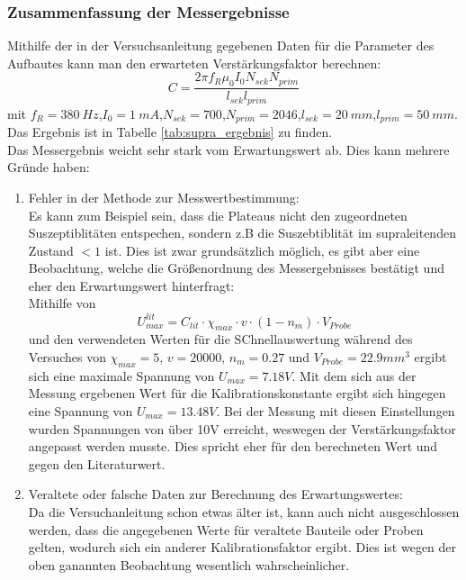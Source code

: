\documentclass[12pt,a4paper]{article}
\begin{document}
\newpage
\subsubsection{Zusammenfassung der Messergebnisse}
Mithilfe der in der Versuchsanleitung gegebenen Daten für die Parameter des Aufbautes kann man den erwarteten Verstärkungsfaktor berechnen:
\begin{equation}
C = \dfrac{2\pi f_R \mu_0 I_0 N_{sek} N_{prim}}{l_{sek} l_{prim}}
\end{equation}
mit $f_R = \SI{380}{Hz}$,$I_0 = \SI{1}{mA}$,$N_{sek} = 700$,$N_{prim} = 2046$,$l_{sek} = \SI{20}{mm}$,$l_{prim} = \SI{50}{mm}$. Das Ergebnis ist in Tabelle \ref{tab:supra_ergebnis} zu finden.\\
Das Messergebnis weicht sehr stark vom Erwartungswert ab. Dies kann mehrere Gründe haben:
\begin{enumerate}
\item Fehler in der Methode zur Messwertbestimmung:\\
Es kann zum Beispiel sein, dass die Plateaus nicht den zugeordneten Suszeptiblitäten entspechen, sondern z.B die Suszebtiblität im supraleitenden Zustand $<1$ ist.
Dies ist zwar grundsätzlich möglich, es gibt aber eine Beobachtung, welche die Größenordnung des Messergebnisses bestätigt und eher den Erwartungswert hinterfragt:\\
Mithilfe von 
\begin{equation}
U_{max}^{lit} = C_{lit} \cdot \chi_{max} \cdot v \cdot (1-n_m) \cdot V_{Probe}
\end{equation}
und den verwendeten Werten für die SChnellauswertung während des Versuches von $\chi_{max} = 5$, $v = 20000$, $n_m = 0.27$ und $V_{Probe} = 22.9mm^3$ ergibt sich eine maximale Spannung von $U_{max} = 7.18V$. Mit dem sich aus der Messung ergebenen Wert für die Kalibrationskonstante ergibt sich hingegen eine Spannung von $U_{max} = 13.48V$. Bei der Messung mit diesen Einstellungen wurden Spannungen von über 10V erreicht, weswegen der Verstärkungsfaktor angepasst werden musste. Dies spricht eher für den berechneten Wert und gegen den Literaturwert.
\item Veraltete oder falsche Daten zur Berechnung des Erwartungswertes:\\
Da die Versuchanleitung schon etwas älter ist, kann auch nicht ausgeschlossen werden, dass die angegebenen Werte für veraltete Bauteile oder Proben gelten, wodurch sich ein anderer Kalibrationsfaktor ergibt. Dies ist wegen der oben ganannten Beobachtung wesentlich wahrscheinlicher.
\end{enumerate}
\end{document}
